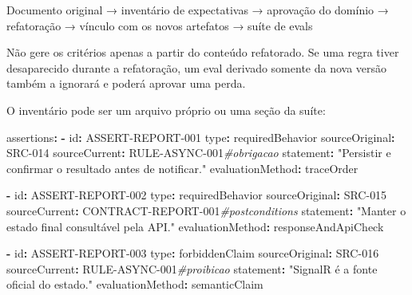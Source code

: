 \documentclass[
  10pt,
  a4paper,
  oneside]{book}
\newenvironment{Shaded}{}{}
\newcommand{\AttributeTok}[1]{\textcolor[rgb]{0.49,0.56,0.16}{#1}}
\newcommand{\CommentTok}[1]{\textcolor[rgb]{0.38,0.63,0.69}{\textit{#1}}}
\newcommand{\FunctionTok}[1]{\textcolor[rgb]{0.02,0.16,0.49}{#1}}
\newcommand{\KeywordTok}[1]{\textcolor[rgb]{0.00,0.44,0.13}{\textbf{#1}}}
\newcommand{\NormalTok}[1]{#1}
\newcommand{\StringTok}[1]{\textcolor[rgb]{0.25,0.44,0.63}{#1}}
\begin{document}
\begin{Shaded}
\begin{Highlighting}[]
\NormalTok{Documento original}
\NormalTok{→ inventário de expectativas}
\NormalTok{→ aprovação do domínio}
\NormalTok{→ refatoração}
\NormalTok{→ vínculo com os novos artefatos}
\NormalTok{→ suíte de evals}
\end{Highlighting}
\end{Shaded}

Não gere os critérios apenas a partir do conteúdo refatorado. Se uma
regra tiver desaparecido durante a refatoração, um eval derivado somente
da nova versão também a ignorará e poderá aprovar uma perda.

O inventário pode ser um arquivo próprio ou uma seção da suíte:

\begin{Shaded}
\begin{Highlighting}[]
\FunctionTok{assertions}\KeywordTok{:}
\AttributeTok{  }\KeywordTok{{-}}\AttributeTok{ }\FunctionTok{id}\KeywordTok{:}\AttributeTok{ ASSERT{-}REPORT{-}001}
\AttributeTok{    }\FunctionTok{type}\KeywordTok{:}\AttributeTok{ requiredBehavior}
\AttributeTok{    }\FunctionTok{sourceOriginal}\KeywordTok{:}\AttributeTok{ SRC{-}014}
\AttributeTok{    }\FunctionTok{sourceCurrent}\KeywordTok{:}\AttributeTok{ RULE{-}ASYNC{-}001}\CommentTok{\#obrigacao}
\AttributeTok{    }\FunctionTok{statement}\KeywordTok{:}\AttributeTok{ }\StringTok{"Persistir e confirmar o resultado antes de notificar."}
\AttributeTok{    }\FunctionTok{evaluationMethod}\KeywordTok{:}\AttributeTok{ traceOrder}

\AttributeTok{  }\KeywordTok{{-}}\AttributeTok{ }\FunctionTok{id}\KeywordTok{:}\AttributeTok{ ASSERT{-}REPORT{-}002}
\AttributeTok{    }\FunctionTok{type}\KeywordTok{:}\AttributeTok{ requiredBehavior}
\AttributeTok{    }\FunctionTok{sourceOriginal}\KeywordTok{:}\AttributeTok{ SRC{-}015}
\AttributeTok{    }\FunctionTok{sourceCurrent}\KeywordTok{:}\AttributeTok{ CONTRACT{-}REPORT{-}001}\CommentTok{\#postconditions}
\AttributeTok{    }\FunctionTok{statement}\KeywordTok{:}\AttributeTok{ }\StringTok{"Manter o estado final consultável pela API."}
\AttributeTok{    }\FunctionTok{evaluationMethod}\KeywordTok{:}\AttributeTok{ responseAndApiCheck}

\AttributeTok{  }\KeywordTok{{-}}\AttributeTok{ }\FunctionTok{id}\KeywordTok{:}\AttributeTok{ ASSERT{-}REPORT{-}003}
\AttributeTok{    }\FunctionTok{type}\KeywordTok{:}\AttributeTok{ forbiddenClaim}
\AttributeTok{    }\FunctionTok{sourceOriginal}\KeywordTok{:}\AttributeTok{ SRC{-}016}
\AttributeTok{    }\FunctionTok{sourceCurrent}\KeywordTok{:}\AttributeTok{ RULE{-}ASYNC{-}001}\CommentTok{\#proibicao}
\AttributeTok{    }\FunctionTok{statement}\KeywordTok{:}\AttributeTok{ }\StringTok{"SignalR é a fonte oficial do estado."}
\AttributeTok{    }\FunctionTok{evaluationMethod}\KeywordTok{:}\AttributeTok{ semanticClaim}
\end{Highlighting}
\end{Shaded}
\end{document}
